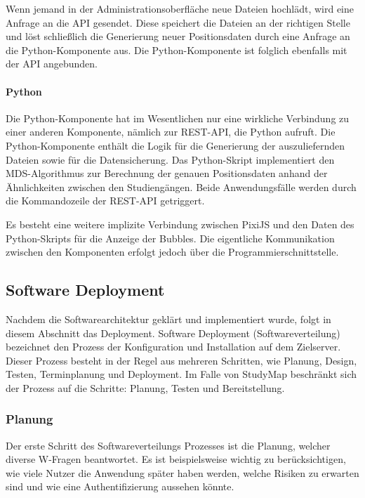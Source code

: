 Wenn jemand in der Administrationsoberfläche neue Dateien hochlädt, wird eine Anfrage an die API gesendet. Diese speichert die Dateien an der richtigen Stelle und löst schließlich die Generierung neuer Positionsdaten durch eine Anfrage an die Python-Komponente aus. Die Python-Komponente ist folglich ebenfalls mit der API angebunden.

\paragraph*{Python}
Die Python-Komponente hat im Wesentlichen nur eine wirkliche Verbindung zu einer anderen Komponente, nämlich zur REST-API, die Python aufruft. Die Python-Komponente enthält die Logik für die Generierung der auszuliefernden Dateien sowie für die Datensicherung. Das Python-Skript implementiert den MDS-Algorithmus zur Berechnung der genauen Positionsdaten anhand der Ähnlichkeiten zwischen den Studiengängen. Beide Anwendungsfälle werden durch die Kommandozeile der REST-API getriggert.

Es besteht eine weitere implizite Verbindung zwischen PixiJS und den Daten des Python-Skripts für die Anzeige der Bubbles. Die eigentliche Kommunikation zwischen den Komponenten erfolgt jedoch über die Programmierschnittstelle.

\newpage
\subsection{Software Deployment}\label{sec:deployment}
Nachdem die Softwarearchitektur geklärt und implementiert wurde, folgt in diesem Abschnitt das Deployment. Software Deployment (Softwareverteilung) bezeichnet den Prozess der Konfiguration und Installation auf dem Zielserver. Dieser Prozess besteht in der Regel aus mehreren Schritten, wie Planung, Design, Testen, Terminplanung und Deployment. \parencite{atera_team_was_2023} Im Falle von StudyMap beschränkt sich der Prozess auf die Schritte: Planung, Testen und Bereitstellung.

\subsubsection{Planung}
Der erste Schritt des Softwareverteilungs Prozesses ist die Planung, welcher diverse W-Fragen beantwortet. Es ist beispielsweise wichtig zu berücksichtigen, wie viele Nutzer die Anwendung später haben werden, welche Risiken zu erwarten sind und wie eine Authentifizierung aussehen könnte. \parencite{atera_team_was_2023}

